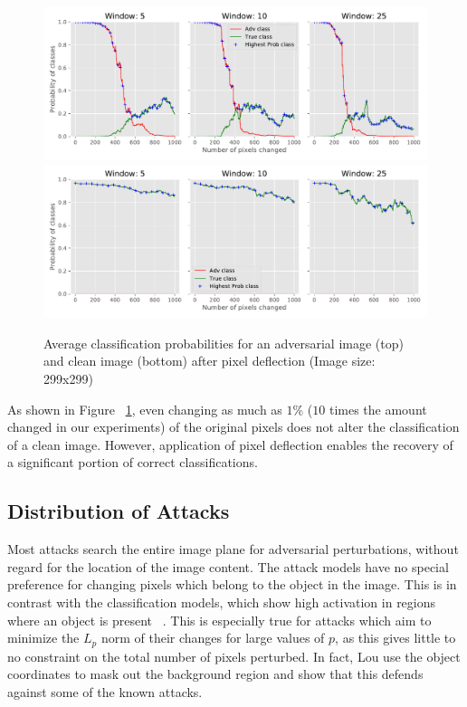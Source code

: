 \begin{figure}[H]
   \includegraphics[width=1\linewidth]{figures/pixel/clean_pixel.pdf}
   \includegraphics[width=1\linewidth]{figures/pixel/clean_pixel_no_adv.pdf}
   \caption[Impact on clean images]{Average classification probabilities for an adversarial image (top) and clean image (bottom) after pixel deflection (Image size: 299x299)}
   \label{fig:pixelloss}
\end{figure}


As shown in Figure ~\ref{fig:pixelloss}, even changing as much as $1\%$ (\ie $10$ times the amount changed in our experiments) of the original pixels does not alter the classification of a clean image.
However, application of pixel deflection enables the recovery of a significant portion of correct classifications.

\subsection{Distribution of Attacks}

Most attacks search the entire image plane for adversarial perturbations, without regard for the location of the image content.
The attack models have no special preference for changing pixels which belong to the object in the image. 
This is in contrast with the classification models, which show high activation in regions where an object is present ~\cite{Yosinski2015UnderstandingNN,Chattopadhyay2017GradCAMGG}. %
This is especially true for attacks which aim to minimize the $L_p$ norm of their changes for large values of $p$, as this gives little to no constraint on the total number of pixels perturbed.
In fact, Lou \etal \cite{FoveationbasedMALuo2015} use the object coordinates to mask out the background region and show that this defends against some of the known attacks. 
 

